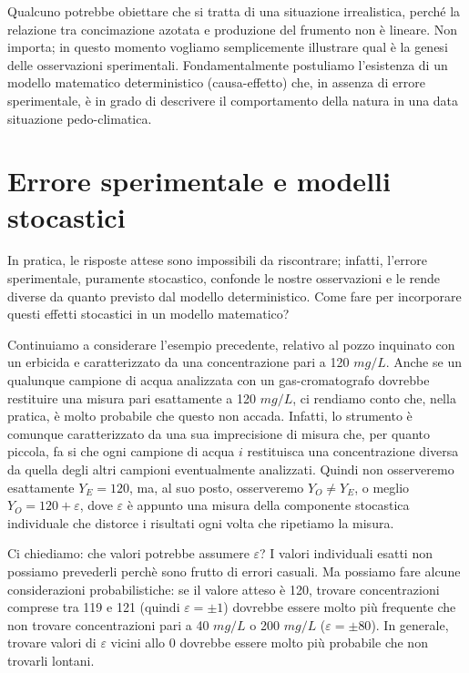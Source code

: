 \documentclass[a4paper,12pt,oneside]{book}
\begin{document}
Qualcuno potrebbe obiettare che si tratta di una situazione irrealistica, perché la relazione tra concimazione azotata e produzione del frumento non è lineare. Non importa; in questo momento vogliamo semplicemente illustrare qual è la genesi delle osservazioni sperimentali. Fondamentalmente postuliamo l'esistenza di un modello matematico deterministico (causa-effetto) che, in assenza di errore sperimentale, è in grado di descrivere il comportamento della natura in una data situazione pedo-climatica.

\hypertarget{errore-sperimentale-e-modelli-stocastici}{%
\section{Errore sperimentale e modelli stocastici}\label{errore-sperimentale-e-modelli-stocastici}}

In pratica, le risposte attese sono impossibili da riscontrare; infatti, l'errore sperimentale, puramente stocastico, confonde le nostre osservazioni e le rende diverse da quanto previsto dal modello deterministico. Come fare per incorporare questi effetti stocastici in un modello matematico?

Continuiamo a considerare l'esempio precedente, relativo al pozzo inquinato con un erbicida e caratterizzato da una concentrazione pari a 120 \(mg/L\). Anche se un qualunque campione di acqua analizzata con un gas-cromatografo dovrebbe restituire una misura pari esattamente a 120 \(mg/L\), ci rendiamo conto che, nella pratica, è molto probabile che questo non accada. Infatti, lo strumento è comunque caratterizzato da una sua imprecisione di misura che, per quanto piccola, fa si che ogni campione di acqua \(i\) restituisca una concentrazione diversa da quella degli altri campioni eventualmente analizzati. Quindi non osserveremo esattamente \(Y_E = 120\), ma, al suo posto, osserveremo \(Y_O \neq Y_E\), o meglio \(Y_O = 120 + \varepsilon\), dove \(\varepsilon\) è appunto una misura della componente stocastica individuale che distorce i risultati ogni volta che ripetiamo la misura.

Ci chiediamo: che valori potrebbe assumere \(\varepsilon\)? I valori individuali esatti non possiamo prevederli perchè sono frutto di errori casuali. Ma possiamo fare alcune considerazioni probabilistiche: se il valore atteso è 120, trovare concentrazioni comprese tra 119 e 121 (quindi \(\varepsilon = \pm 1\)) dovrebbe essere molto più frequente che non trovare concentrazioni pari a 40 \(mg/L\) o 200 \(mg/L\) (\(\varepsilon = \pm 80\)). In generale, trovare valori di \(\varepsilon\) vicini allo 0 dovrebbe essere molto più probabile che non trovarli lontani.
\end{document}
